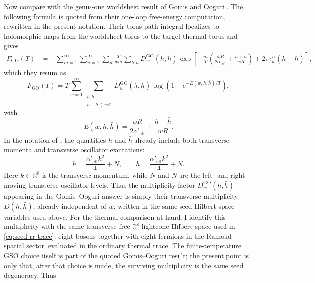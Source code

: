 \documentclass[11pt]{article}
\newcommand{\Aeff}{\alpha'_{\mathrm{eff}}}
\newcommand{\bR}{\mathbb{R}}
\begin{document}
Now compare with the genus-one worldsheet result of Gomis and Ooguri \cite{gomis2000nonrelativisticclosedstringtheory}. The following formula is quoted from their one-loop free-energy computation, rewritten in the present notation. Their torus path integral localizes to holomorphic maps from the worldsheet torus to the target thermal torus and gives
\begin{equation}\label{eq:go-free-energy-sum}
\begin{aligned}
F_{\mathrm{GO}}(T)
&=
-\sum_{m=1}^\infty \sum_{w=1}^\infty \sum_{n}
\frac{T}{wm}\sum_{h,\bar h}D^{\mathrm{GO}}_w(h,\bar h)\,
\exp\!\left[
-\frac{m}{T}\left(
\frac{wR}{2\Aeff}+\frac{h+\bar h}{wR}
\right)
+2\pi i \frac{n}{w}(h-\bar h)
\right],
\end{aligned}
\end{equation}
which they resum as
\begin{equation}\label{eq:go-free-energy-log}
F_{\mathrm{GO}}(T)
=
T\sum_{w=1}^\infty
\sum_{\substack{h,\bar h\\ h-\bar h\in w\mathbb Z}}
D^{\mathrm{GO}}_w(h,\bar h)\,
\log\!\left(
1-e^{-E(w,h,\bar h)/T}
\right),
\end{equation}
with
\begin{equation}\label{eq:go-energy}
E(w,h,\bar h)
=
\frac{wR}{2\Aeff}+\frac{h+\bar h}{wR}.
\end{equation}
In the notation of \cite{gomis2000nonrelativisticclosedstringtheory}, the quantities $h$ and $\bar h$ already include both transverse momenta and transverse oscillator excitations:
\begin{equation}\label{eq:go-transverse-weights}
h=\frac{\Aeff k^2}{4}+N,
\qquad
\bar h=\frac{\Aeff k^2}{4}+\bar N.
\end{equation}
Here $k\in \bR^8$ is the transverse momentum, while $N$ and $\bar N$ are the left- and right-moving transverse oscillator levels. Thus the multiplicity factor $D_w^{\mathrm{GO}}(h,\bar h)$ appearing in the Gomis--Ooguri answer is simply their transverse multiplicity $D(h,\bar h)$, already independent of $w$, written in the same seed Hilbert-space variables used above. For the thermal comparison at hand, I identify this multiplicity with the same transverse free $\bR^8$ lightcone Hilbert space used in \eqref{eq:seed-rr-trace}: eight bosons together with eight fermions in the Ramond spatial sector, evaluated in the ordinary thermal trace. The finite-temperature GSO choice itself is part of the quoted Gomis--Ooguri result; the present point is only that, after that choice is made, the surviving multiplicity is the same seed degeneracy. Thus
\end{document}
